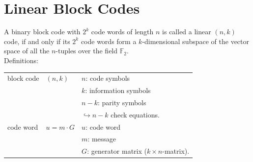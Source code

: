 \section{Linear Block Codes}
A binary block code with $2^k$ code words of length $n$ is called a linear $(n,k)$ code, if and only if its $2^k$ 
code words form a $k$-dimensional subspace of the vector space of all the $n$-tuples over the field $\mathbb{F}_2$.\\

Definitions:\\
\begin{tabular}{| l |l | l |}
	\hline
	 block code			&	$(n,k)$				&	$n$: code symbols\\
						&						&	$k$: information symbols\\
						&						&	$n-k$: parity symbols \\
						&						&   $\hookrightarrow n-k$ check equations.\\
	\hline
	code word			&	$u=m \cdot G$ 		&	$u$: code word \\
						&						&   $m$: message \\
						&						&	$G$: generator matrix ($k \times n$-matrix).\\


\end{tabular}
